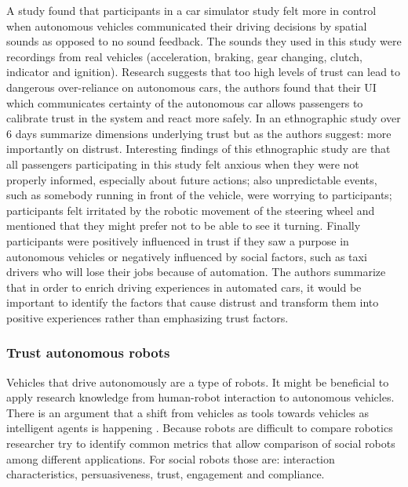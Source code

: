 A study \cite{Beattie} found that participants in a car simulator study felt more in control when autonomous vehicles communicated their driving decisions by spatial sounds as opposed to no sound feedback. The sounds they used in this study were recordings from real vehicles (acceleration, braking, gear changing, clutch, indicator and ignition). Research \cite{Helldin2013PresentingDriving} suggests that too high levels of trust can lead to dangerous over-reliance on autonomous cars, the authors found that their UI which communicates certainty of the autonomous car allows passengers to calibrate trust in the system and react more safely. In an ethnographic study over 6 days \cite{Lee2016} summarize dimensions underlying trust but as the authors suggest: more importantly on distrust.  Interesting findings of this ethnographic study are that all passengers participating in this study felt anxious when they were not properly informed, especially about future actions; also unpredictable events, such as somebody running in front of the vehicle, were worrying to participants; participants felt irritated by the robotic movement of the steering wheel and mentioned that they might prefer not to be able to see it turning. Finally participants were positively influenced in trust if they saw a purpose in autonomous vehicles or negatively influenced by social factors, such as taxi drivers who will lose their jobs because of automation. The authors summarize that in order to enrich driving experiences in automated cars, it would be important to identify the factors that cause distrust and transform them into positive experiences rather than emphasizing trust factors. 

\subsubsection{Trust autonomous robots}
Vehicles that drive autonomously are a type of robots. It might be beneficial to apply research knowledge from human-robot interaction to autonomous vehicles. There is an argument that a shift from vehicles as tools towards vehicles as intelligent agents is happening \cite{Thill}. Because robots are difficult to compare robotics researcher \cite{Steinfeld2006} try to identify common metrics that allow comparison of social robots among different applications. For social robots those are: interaction characteristics, persuasiveness, trust, engagement and compliance. 

